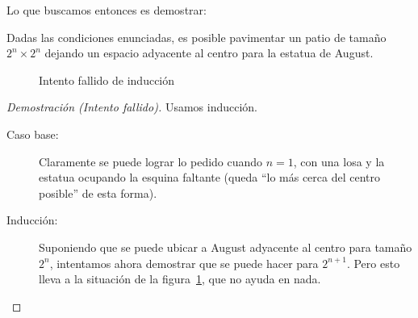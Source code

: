   Lo que buscamos entonces es demostrar:
  \begin{proposition}
    \label{prop:pavimentar}
    Dadas las condiciones enunciadas,
    es posible pavimentar
    un patio de tamaño \mbox{\(2^n \times 2^n\)}
    dejando un espacio adyacente al centro
    para la estatua de \foreignlanguage{english}{August}.
  \end{proposition}

  \begin{figure}[htbp]
    \centering
    \caption{Intento fallido de inducción}
    \label{fig:tiling-fail}
  \end{figure}
  \begin{proof}[Demostración (Intento fallido)]
    \renewcommand{\qedsymbol}{\textthing}
    Usamos inducción.
    \begin{description}
    \item[Caso base:]
      Claramente se puede lograr lo pedido cuando \(n = 1\),
      con una losa y la estatua ocupando la esquina faltante
      (queda ``lo más cerca del centro posible'' de esta forma).
    \item[Inducción:]
      Suponiendo que se puede ubicar a
      \foreignlanguage{english}{August}
      adyacente al centro para tamaño \(2^n\),
      intentamos ahora demostrar
      que se puede hacer para \(2^{n + 1}\).
      Pero esto lleva a la situación
      de la figura~\ref{fig:tiling-fail},
      que no ayuda en nada.
      \qedhere
    \end{description}
  \end{proof}

